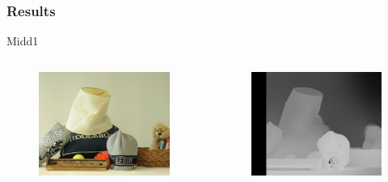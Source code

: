 \documentclass{beamer}
\begin{document}
\begin{frame}
\frametitle{Results}
Midd1
\begin{columns}[c] %

\begin{figure}
\includegraphics[width=0.7\linewidth]{../program/dataset/Midd1/view1.png}
\end{figure}

\begin{figure}
\includegraphics[width=0.7\linewidth]{../program/Result/Midd1.png}
\end{figure}

\end{columns}
\end{frame}

\end{document}
